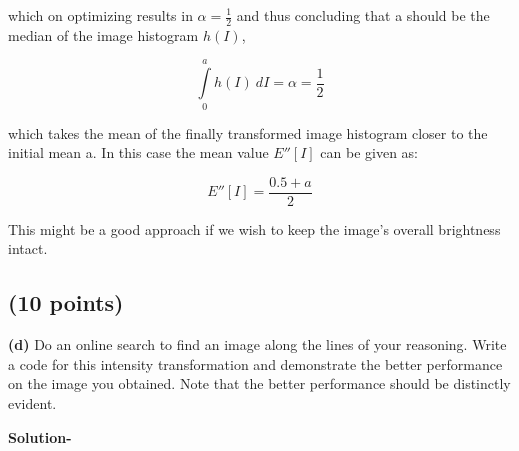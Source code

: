 \documentclass{article}
\begin{document}
which on optimizing results in $\alpha = \frac{1}{2}$ and thus concluding that a should
be the median of the image histogram $h(I)$,

\begin{equation}\int\limits_0^a h(I)\ dI = \alpha = \frac{1}{2}\end{equation}

which takes the mean of the finally transformed image histogram closer
to the initial mean a. In this case the mean value $E''[I]$ can be given as:

\begin{equation}E''[I] = \frac{0.5+a}{2}\end{equation}

This might be a good approach if we wish to keep the image’s overall
brightness intact.

\subsection{(10 points)}
\textbf{(d)} Do an online search to find an image along the lines of your reasoning.
Write a code for this intensity transformation and demonstrate the better
performance on the image you obtained. Note that the better performance
should be distinctly evident.

\textbf{Solution-}
\end{document}
